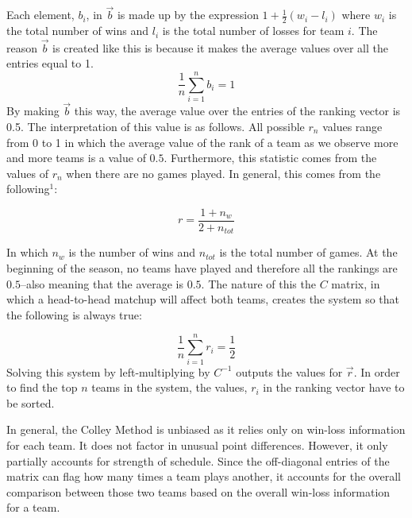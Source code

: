\documentclass[12pt]{article}
\begin{document}
Each element, $b_i$, in $\vec{b}$ is made up by the expression $1 + \frac{1}{2}(w_i - l_i)$ where $w_i$ is the total number of wins and $l_i$ is the total number of losses for team $i$. The reason $\vec{b}$ is created like this is because it makes the average values over all the entries equal to 1.
\begin{equation}
\frac{1}{n}\sum_{i=1}^{n} b_{i} = 1
\end{equation}
By making $\vec{b}$ this way, the average value over the entries of the ranking vector is 0.5. The interpretation of this value is as follows. All possible $r_n$ values range from 0 to 1 in which the average value of the rank of a team as we observe more and more teams is a value of $0.5$. Furthermore, this statistic comes from the values of $r_n$ when there are no games played. In general, this comes from the following$^1$:

\begin{equation}
r = \frac{1 + n_w}{2 + n_{tot}}
\end{equation}

In which $n_w$ is the number of wins and $n_{tot}$ is the total number of games. At the beginning of the season, no teams have played and therefore all the rankings are $0.5$--also meaning that the average is $0.5$. The nature of this the $C$ matrix, in which a head-to-head matchup will affect both teams, creates the system so that the following is always true:

\begin{equation}
\frac{1}{n}\sum_{i=1}^{n} r_{i} = \frac{1}{2}
\end{equation}
Solving this system by left-multiplying by $C^{-1}$ outputs the values for $\vec{r}$. In order to find the top $n$ teams in the system, the values, $r_i$ in the ranking vector have to be sorted.

In general, the Colley Method is unbiased as it relies only on win-loss information for each team. It does not factor in unusual point differences. However, it only partially accounts for strength of schedule. Since the off-diagonal entries of the matrix can flag how many times a team plays another, it accounts for the overall comparison between those two teams based on the overall win-loss information for a team.
\end{document}
